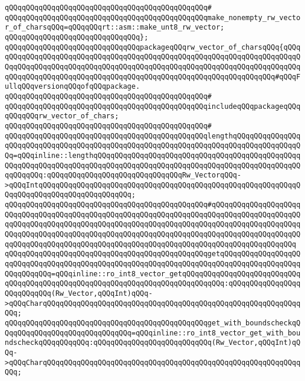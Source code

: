 \verb|qQQqqQQqqQQqqQQqqQQqqQQqqQQqqQQqqQQqqQQqqQQqqQQq#|\newline
\verb|qQQqqQQqqQQqqQQqqQQqqQQqqQQqqQQqqQQqqQQqqQQqqQQqmake_nonempty_rw_vector_of_charsqQQq=qQQqqQQqrt::asm::make_unt8_rw_vector;|\newline
\verb|qQQqqQQqqQQqqQQqqQQqqQQqqQQqqQQq};|\newline
\newline
\verb|qQQqqQQqqQQqqQQqqQQqqQQqqQQqqQQqpackageqQQqrw_vector_of_charsqQQq{qQQqqQQqqQQqqQQqqQQqqQQqqQQqqQQqqQQqqQQqqQQqqQQqqQQqqQQqqQQqqQQqqQQqqQQqqQQqqQQqqQQqqQQqqQQqqQQqqQQqqQQqqQQqqQQqqQQqqQQqqQQqqQQqqQQqqQQqqQQqqQQqqQQqqQQqqQQqqQQqqQQqqQQqqQQqqQQqqQQqqQQqqQQqqQQqqQQqqQQqqQQqqQQq#qQQqFullqQQqversionqQQqofqQQqpackage.|\newline
\verb|qQQqqQQqqQQqqQQqqQQqqQQqqQQqqQQqqQQqqQQqqQQqqQQq#|\newline
\verb|qQQqqQQqqQQqqQQqqQQqqQQqqQQqqQQqqQQqqQQqqQQqqQQqincludeqQQqpackageqQQqqQQqqQQqrw_vector_of_chars;|\newline
\verb|qQQqqQQqqQQqqQQqqQQqqQQqqQQqqQQqqQQqqQQqqQQqqQQq#|\newline
\verb|qQQqqQQqqQQqqQQqqQQqqQQqqQQqqQQqqQQqqQQqqQQqqQQqlengthqQQqqQQqqQQqqQQqqQQqqQQqqQQqqQQqqQQqqQQqqQQqqQQqqQQqqQQqqQQqqQQqqQQqqQQqqQQqqQQqqQQqqQQq=qQQqinline::lengthqQQqqQQqqQQqqQQqqQQqqQQqqQQqqQQqqQQqqQQqqQQqqQQqqQQqqQQqqQQqqQQqqQQqqQQqqQQqqQQqqQQqqQQqqQQqqQQqqQQqqQQqqQQqqQQqqQQqqQQqqQQqqQQq:qQQqqQQqqQQqqQQqqQQqqQQqqQQqqQQqRw_VectorqQQq->qQQqIntqQQqqQQqqQQqqQQqqQQqqQQqqQQqqQQqqQQqqQQqqQQqqQQqqQQqqQQqqQQqqQQqqQQqqQQqqQQqqQQqqQQqqQQqqQQq;|\newline
\verb|qQQqqQQqqQQqqQQqqQQqqQQqqQQqqQQqqQQqqQQqqQQqqQQq#qQQqqQQqqQQqqQQqqQQqqQQqqQQqqQQqqQQqqQQqqQQqqQQqqQQqqQQqqQQqqQQqqQQqqQQqqQQqqQQqqQQqqQQqqQQqqQQqqQQqqQQqqQQqqQQqqQQqqQQqqQQqqQQqqQQqqQQqqQQqqQQqqQQqqQQqqQQqqQQqqQQqqQQqqQQqqQQqqQQqqQQqqQQqqQQqqQQqqQQqqQQqqQQqqQQqqQQqqQQqqQQqqQQqqQQqqQQqqQQqqQQqqQQqqQQqqQQqqQQqqQQqqQQqqQQqqQQqqQQqqQQqqQQqqQQqqQQqqQQq|\newline
\verb|qQQqqQQqqQQqqQQqqQQqqQQqqQQqqQQqqQQqqQQqqQQqqQQqgetqQQqqQQqqQQqqQQqqQQqqQQqqQQqqQQqqQQqqQQqqQQqqQQqqQQqqQQqqQQqqQQqqQQqqQQqqQQqqQQqqQQqqQQqqQQqqQQqqQQq=qQQqinline::ro_int8_vector_getqQQqqQQqqQQqqQQqqQQqqQQqqQQqqQQqqQQqqQQqqQQqqQQqqQQqqQQqqQQqqQQqqQQqqQQqqQQqqQQq:qQQqqQQqqQQqqQQqqQQqqQQqqQQq(Rw_Vector,qQQqInt)qQQq->qQQqCharqQQqqQQqqQQqqQQqqQQqqQQqqQQqqQQqqQQqqQQqqQQqqQQqqQQqqQQqqQQqqQQq;|\newline
\verb|qQQqqQQqqQQqqQQqqQQqqQQqqQQqqQQqqQQqqQQqqQQqqQQqget_with_boundscheckqQQqqQQqqQQqqQQqqQQqqQQqqQQqqQQq=qQQqinline::ro_int8_vector_get_with_boundscheckqQQqqQQqqQQq:qQQqqQQqqQQqqQQqqQQqqQQqqQQq(Rw_Vector,qQQqInt)qQQq->qQQqCharqQQqqQQqqQQqqQQqqQQqqQQqqQQqqQQqqQQqqQQqqQQqqQQqqQQqqQQqqQQqqQQq;|\newline
